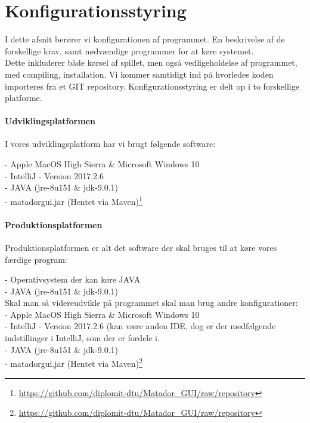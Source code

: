 \chapter{Konfigurationsstyring}

I dette afsnit berører vi konfigurationen af programmet.
En beskrivelse af de forskellige krav, samt nødvændige programmer for at køre systemet. 
\\Dette inkluderer både kørsel af spillet, men også vedligeholdelse af programmet, med compiling, installation.
Vi kommer samtidigt ind på hvorledes koden importeres fra et GIT repository.
Konfigurationsstyring er delt op i to forskellige platforme. \\

\subsubsection{Udviklingsplatformen}

I vores udviklingsplatform har vi brugt følgende software:

\noindent - Apple MacOS High Sierra \& Microsoft Windows 10 \\
- IntelliJ - Version 2017.2.6 \\
- JAVA (jre-8u151 \& jdk-9.0.1) \\
- matadorgui.jar (Hentet via Maven)\footnote{\url{https://github.com/diplomit-dtu/Matador_GUI/raw/repository}}\\

\subsubsection{Produktionsplatformen}
Produktionsplatformen er alt det software der skal bruges til at køre vores færdige program:

\noindent - Operativsystem der kan køre JAVA\\
- JAVA (jre-8u151 \& jdk-9.0.1) \\

\noindent Skal man så videreudvikle på programmet skal man brug andre konfigurationer:\\
\noindent - Apple MacOS High Sierra \& Microsoft Windows 10 \\
- IntelliJ - Version 2017.2.6 (kan være anden IDE, dog er der medfølgende indstillinger i IntelliJ, som der er fordele i. \\
- JAVA (jre-8u151 \& jdk-9.0.1) \\
- matadorgui.jar (Hentet via Maven)\footnote{\url{https://github.com/diplomit-dtu/Matador_GUI/raw/repository}}\\


